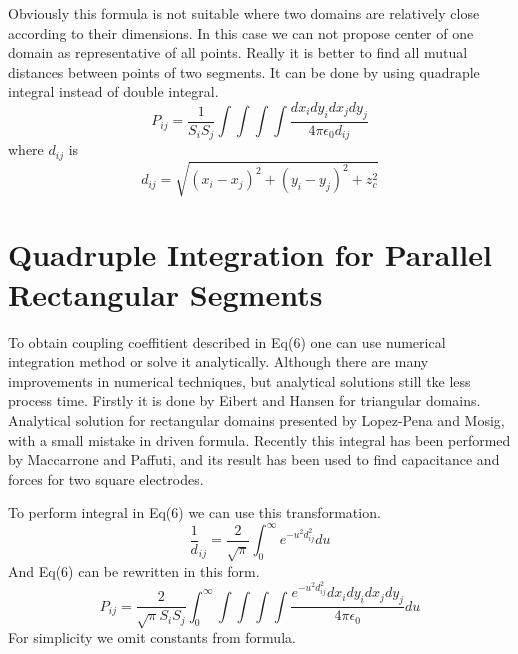\documentclass[twoside,twocolumn]{article}
\begin{document}
Obviously this formula is not suitable where two domains are relatively close according to their dimensions. In this case we can not propose center of one domain as representative of all points. Really it is better to find all mutual distances between points of two segments. It can be done by using quadraple integral instead of double integral.
\begin{equation}
\label {eq6}
P_{ij} = \frac 1 {S_i S_j}\int \int \int \int \frac{dx_i dy_i dx_j dy_j}{4 \pi \epsilon_0 d_{ij}}
\end{equation} 
where $d _{ij}$ is 
\begin{equation}
\label {eq7}
d_{ij} = \sqrt{(x_i-x_j)^2 + (y_i-y_j)^2 + z_c^2}
\end{equation} 

\section{Quadruple Integration for Parallel Rectangular Segments}
To obtain coupling coeffitient described in Eq(6) one can use numerical integration method or solve it analytically. Although there are many improvements in numerical techniques, but analytical solutions still tke less process time. Firstly it is done by Eibert and Hansen for triangular domains. Analytical solution for rectangular domains presented by Lopez-Pena and Mosig, with a small mistake in driven formula. Recently this integral has been performed by Maccarrone and Paffuti, and its result has been used to find capacitance and forces for two square electrodes.

To perform integral in Eq(6) we can use this transformation.
\begin{equation}\label {eq8}
\frac 1 d_{ij} = \frac{2}{\sqrt{\pi}}\int_0^{\infty} e^{-u^2 d_{ij}^2 }du
\end{equation}
And Eq(6) can be rewritten in this form.
\begin{equation}
\label {eq9}
P_{ij} = \frac 2 {\sqrt{\pi} S_i S_j}\int_0^{\infty}\int \int \int \int \frac{e^{-u^2 d_{ij}^2 } dx_i dy_i dx_j dy_j}{4 \pi \epsilon_0 } du
\end{equation}
For simplicity we omit constants from formula.
\end{document}
